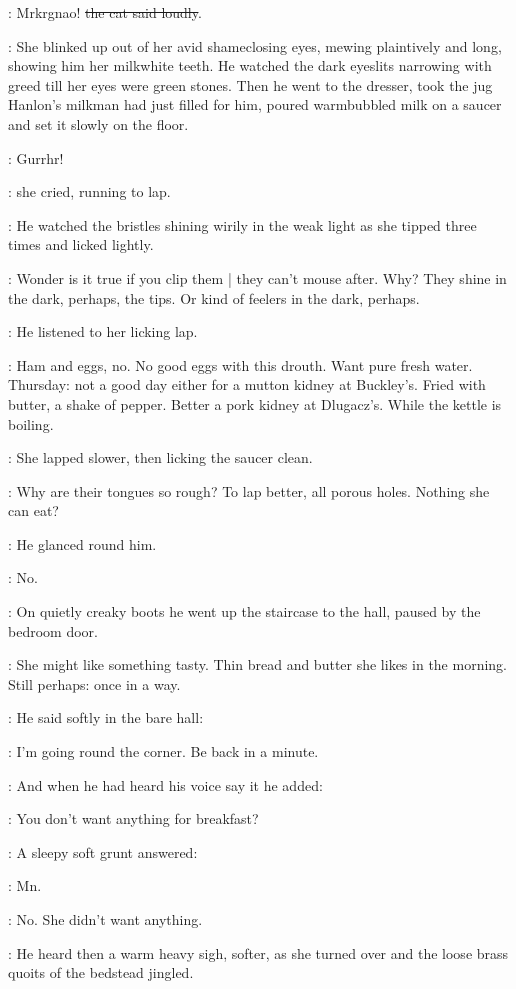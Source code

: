\Cat:
Mrkrgnao!
\sout{the cat said loudly}.

:
She blinked up out of her avid shameclosing eyes,
mewing plaintively and long,
showing him her milkwhite teeth.
He watched the dark eyeslits narrowing with greed
till her eyes were green stones.
Then he went to the dresser,
took the jug Hanlon's milkman had just filled for him,
poured warmbubbled milk on a saucer
and set it slowly on the floor.

\Cat:
Gurrhr!

:
she cried, running to lap.

:
He watched the bristles shining wirily in the weak light
as she tipped three times and licked lightly.

\BloomInt:
Wonder is it true if you clip them |
they can't mouse after.
Why?
They shine in the dark, perhaps, the tips.
Or kind of feelers in the dark, perhaps.

:
He listened to her licking lap.

\BloomInt:
Ham and eggs, no.
No good eggs with this drouth.
Want pure fresh water.
Thursday: not a good day either for a mutton kidney at Buckley's.
Fried with butter, a shake of pepper.
Better a pork kidney at Dlugacz's.
While the kettle is boiling.

:
She lapped slower, then licking the saucer clean.

\BloomInt:
Why are their tongues so rough?
To lap better, all porous holes.
Nothing she can eat?

:
He glanced round him.

\BloomInt:
No.

:
On quietly creaky boots
he went up the staircase to the hall,
paused by the bedroom door.

\BloomInt:
She might like something tasty.
Thin bread and butter
she likes in the morning.
Still perhaps:
once in a way.

:
He said softly in the bare hall:

\Bloom:
I'm going round the corner.
Be back in a minute.

:
And when he had heard his voice say it
he added:

\Bloom:
You don't want anything for breakfast?

:
A sleepy soft grunt answered:

\Molly:
Mn.

:
No.
She didn't want anything.

:
He heard then a warm heavy sigh, softer,
as she turned over and the loose brass quoits of the bedstead jingled.

